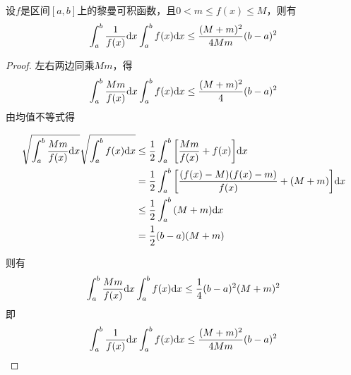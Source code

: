 \begin{theorem}
    
    设$f$是区间$[a, b]$上的黎曼可积函数，且$0 < m \leq f(x) \leq M$，则有
    $$\int_{a}^{b}{\dfrac{1}{f(x)}}\mathrm{d} x \int_{a}^{b}{f(x)}\mathrm{d} x \leq \dfrac{(M + m)^2}{4Mm}(b - a)^2 $$

\end{theorem}

\begin{proof}
    
    左右两边同乘$Mm$，得
    $$\int_{a}^{b}{\dfrac{Mm}{f(x)}}\mathrm{d} x \int_{a}^{b}{f(x)}\mathrm{d} x \leq \dfrac{(M + m)^2}{4}(b - a)^2$$
    由均值不等式得

    \begin{align*}
        \sqrt{\int_{a}^{b}{\dfrac{Mm}{f(x)}}\mathrm{d} x} \sqrt{\int_{a}^{b}{f(x)}\mathrm{d} x} & \leq \dfrac{1}{2} \int_{a}^{b}{\left[ \dfrac{Mm}{f(x)} + f(x) \right]}\mathrm{d} x \\
        & = \dfrac{1}{2} \int_{a}^{b}{\left[ \dfrac{(f(x) - M)(f(x) - m)}{f(x)} + (M + m) \right]}\mathrm{d} x \\
        & \leq \dfrac{1}{2} \int_{a}^{b}{(M + m)}\mathrm{d} x \\
        & = \dfrac{1}{2}(b - a)(M + m)
    \end{align*}

    则有
    $$\int_{a}^{b}{\dfrac{Mm}{f(x)}}\mathrm{d} x \int_{a}^{b}{f(x)}\mathrm{d} x \leq \dfrac{1}{4} (b - a)^2(M + m)^2$$
    即
    $$ \int_{a}^{b}{\dfrac{1}{f(x)}}\mathrm{d} x \int_{a}^{b}{f(x)}\mathrm{d} x \leq \dfrac{(M + m)^2}{4Mm}(b - a)^2 $$

\end{proof}